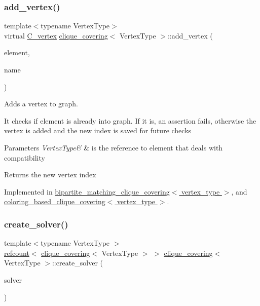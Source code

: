 \subsubsection{\texorpdfstring{add\+\_\+vertex()}{add\_vertex()}}
{\footnotesize\ttfamily template$<$typename Vertex\+Type$>$ \\
virtual \hyperlink{clique__covering__graph_8hpp_a9cb45047ea8c5ed95a8cfa90494345aa}{C\+\_\+vertex} \hyperlink{classclique__covering}{clique\+\_\+covering}$<$ Vertex\+Type $>$\+::add\+\_\+vertex (\begin{DoxyParamCaption}\item[{const Vertex\+Type \&}]{element,  }\item[{const std\+::string \&}]{name }\end{DoxyParamCaption})\hspace{0.3cm}{\ttfamily [pure virtual]}}



Adds a vertex to graph. 

It checks if element is already into graph. If it is, an assertion fails, otherwise the vertex is added and the new index is saved for future checks 
\begin{DoxyParams}{Parameters}
{\em Vertex\+Type\&} & is the reference to element that deals with compatibility \\
\hline
\end{DoxyParams}
\begin{DoxyReturn}{Returns}
the new vertex index 
\end{DoxyReturn}


Implemented in \hyperlink{classbipartite__matching__clique__covering_a78ab8166598fa7d3d6cfb9162ee07bd0}{bipartite\+\_\+matching\+\_\+clique\+\_\+covering$<$ vertex\+\_\+type $>$}, and \hyperlink{classcoloring__based__clique__covering_a1cac12eca65c32da20c7e8aee33ebf65}{coloring\+\_\+based\+\_\+clique\+\_\+covering$<$ vertex\+\_\+type $>$}.

\mbox{\label{classclique__covering_a6527a9e4fa54206327d9fad4194b9acf}} 
\subsubsection{\texorpdfstring{create\+\_\+solver()}{create\_solver()}}
{\footnotesize\ttfamily template$<$typename Vertex\+Type $>$ \\
\hyperlink{structrefcount}{refcount}$<$ \hyperlink{classclique__covering}{clique\+\_\+covering}$<$ Vertex\+Type $>$ $>$ \hyperlink{classclique__covering}{clique\+\_\+covering}$<$ Vertex\+Type $>$\+::create\+\_\+solver (\begin{DoxyParamCaption}\item[{\hyperlink{clique__covering_8hpp_acc23ade19dac4d6935b7792353e207d9}{Clique\+Covering\+\_\+\+Algorithm}}]{solver }\end{DoxyParamCaption})\hspace{0.3cm}{\ttfamily [static]}}



